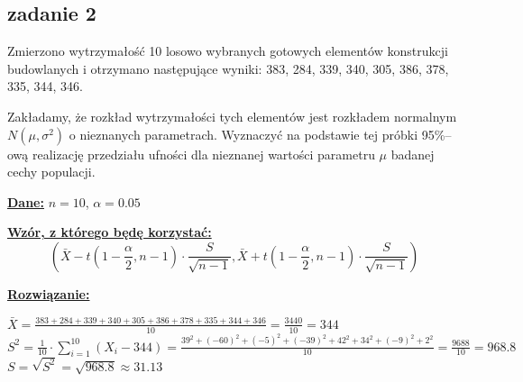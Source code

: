 \subsection{zadanie 2}
Zmierzono wytrzymałość 10 losowo wybranych gotowych elementów konstrukcji budowlanych i otrzymano następujące wyniki: 383, 284, 339, 340, 305, 386, 378, 335, 344, 346.

Zakładamy, że rozkład wytrzymałości tych elementów jest rozkładem normalnym $N(\mu,\sigma^2)$ o nieznanych parametrach. Wyznaczyć na podstawie tej próbki 95\%--ową realizację przedziału ufności dla nieznanej wartości parametru $\mu$ badanej cechy populacji. 
\newline

\textbf{\underline{Dane:}}
$n = 10$,
$\alpha = 0.05$
\newline

\textbf{\underline{Wzór, z którego będę korzystać:}}
$$
\left(
\bar X - t \left(1-\frac{\alpha}{2},n-1 \right) \cdot \frac{S}{\sqrt{n-1}},
\bar X + t \left(1-\frac{\alpha}{2},n-1 \right) \cdot \frac{S}{\sqrt{n-1}}
\right)
$$

\textbf{\underline{Rozwiązanie:}}

\begin{flushleft} 
\large{$\bar X = \frac{383+284+339+340+305+386+378+335+344+346}{10} =\frac{3440}{10} = 344$} \newline \newline
\large{$S^{2} = \frac{1}{10} \cdot \sum_{i=1}^{10} (X_{i} - 344) = \frac{39^{2}+(-60)^{2}+(-5)^{2}+(-39)^{2}+42^{2}+34^{2}+(-9)^{2}+2^{2}}{10} = \frac{9688}{10} = 968.8$} \newline \newline
$S = \sqrt{S^{2}}  = \sqrt{968.8} \approx 31.13$
\end{flushleft}

